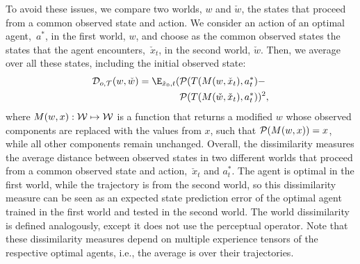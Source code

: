 To avoid these issues, we compare two worlds, $w$ and $\check{w}$, the states that proceed from a common observed state and action.
We consider an action of an optimal agent,~$a^*$, in the first world, $w$, and choose as the common observed states the states that the agent encounters,~$\check{x}_t$, in the second world, $\check{w}$.
Then, we average over all these states, including the initial observed state:
\begin{align*}
 {{\cal D}}_{o,{\cal T}}(w, \check{w}) =
\E_{\check{x}_0,t} 
(
 &{\cal P}(T(M(w,\check{x}_t),a^*_{t}) - \\
 &{\cal P}(T(M(\check{w},\check{x}_t),a^*_{t}) 
 )^2,
\end{align*}
where $M(w,x):{\cal W} \mapsto {\cal W}$ is a function that returns a  modified $w$ whose observed components are replaced with the values from $x$, such that ${\cal P}(M(w,x))=x$, while all other components remain unchanged. 
Overall, the dissimilarity measures the average distance between observed states in two different worlds that proceed from a common observed state and action,~$\check{x}_t$ and $a^*_t$.
The agent is optimal in the first world, while the trajectory is from the second world, so this dissimilarity measure can be seen as an expected state prediction error of the optimal agent trained in the first world and tested in the second world.
% 
The world dissimilarity is defined analogously, except it does not use the perceptual operator.
Note that these dissimilarity measures depend on multiple experience tensors of the respective optimal agents, i.e., the average is over their trajectories.

